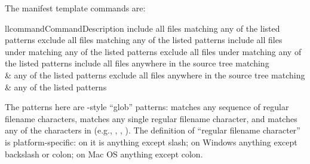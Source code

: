 \documentclass{manual}
\begin{document}

The manifest template commands are:

\begin{tableii}{ll}{command}{Command}{Description}
    {include all files matching any of the listed patterns}
    {exclude all files matching any of the listed patterns}
    {include all files under  matching any of the listed patterns}
    {exclude all files under  matching any of the listed patterns}
    {include all files anywhere in the source tree matching\\&
     any of the listed patterns}
    {exclude all files anywhere in the source tree matching\\&
     any of the listed patterns}
\end{tableii}

The patterns here are \UNIX-style ``glob'' patterns: \code{*} matches any
sequence of regular filename characters,  matches any single
regular filename character, and  matches any of the
characters in  (e.g., , ,
).  The definition of ``regular filename character'' is
platform-specific: on \UNIX{} it is anything except slash; on Windows
anything except backslash or colon; on Mac OS anything except colon.






\end{document}
